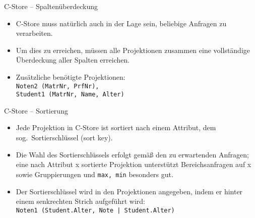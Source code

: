 \begin{frame}{C-Store -- Spalten\"uberdeckung}
\begin{itemize}[<.->]
\item<+-> C-Store muss nat\"urlich auch in der Lage sein, beliebige Anfragen zu verarbeiten.
\item Um dies zu erreichen, m\"ussen alle Projektionen zusammen eine vollst\"andige \"Uberdeckung aller Spalten erreichen.
\item<+-> Zus\"atzliche ben\"otigte Projektionen: \\
\vspace{3mm}
  {\small
  \texttt{Noten2 (MatrNr, PrfNr), \\
  Student1 (MatrNr, Name, Alter)}
  }
\end{itemize}
\end{frame}

\begin{frame}{C-Store -- Sortierung}
\begin{itemize}[<+->]
	\item Jede Projektion in C-Store ist sortiert nach einem Attribut, dem sog.\ Sortierschl\"ussel (sort key).
	\item Die Wahl des Sortierschl\"ussels erfolgt gem\"a{\ss} den zu erwartenden Anfragen; eine nach Attribut x sortierte Projektion unterst\"utzt Bereichsanfragen auf x sowie Gruppierungen und \texttt{max, min} besonders gut.
	\item Der Sortierschl\"ussel wird in den Projektionen angegeben, indem er hinter einem senkrechten Strich aufgef\"uhrt wird: \\
	{\small\texttt{Noten1 (Student.Alter, Note | Student.Alter)}}
\end{itemize}
\end{frame}

